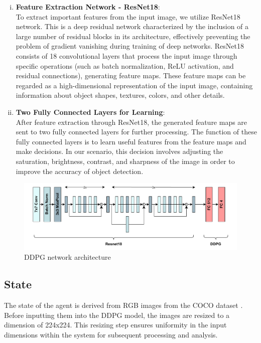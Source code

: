 \documentclass{PHlab-thesis}
\begin{document}
\begin{enumerate}[(i)]
\item \textbf{Feature Extraction Network - ResNet18}: \\
To extract important features from the input image, we utilize ResNet18 network. This is a deep residual network characterized by the inclusion of a large number of residual blocks in its architecture, effectively preventing the problem of gradient vanishing during training of deep networks. ResNet18 consists of 18 convolutional layers that process the input image through specific operations (such as batch normalization, ReLU activation, and residual connections), generating feature maps. These feature maps can be regarded as a high-dimensional representation of the input image, containing information about object shapes, textures, colors, and other details.

\item \textbf{Two Fully Connected Layers for Learning}: \\
After feature extraction through ResNet18, the generated feature maps are sent to two fully connected layers for further processing. The function of these fully connected layers is to learn useful features from the feature maps and make decisions. In our scenario, this decision involves adjusting the saturation, brightness, contrast, and sharpness of the image in order to improve the accuracy of object detection.
\end{enumerate}

\begin{figure}[H] 
    \centering 
    \includegraphics[width=\textwidth]{images/DDPG network architecture.pdf} 
    \caption{DDPG network architecture} 
    \label{Fig.DDPG network architecture} 
\end{figure}

\subsection{State}
The state of the agent is derived from RGB images from the COCO dataset \cite{lin2014microsoft}. Before inputting them into the DDPG model, the images are resized to a dimension of 224x224. This resizing step ensures uniformity in the input dimensions within the system for subsequent processing and analysis.
\end{document}
